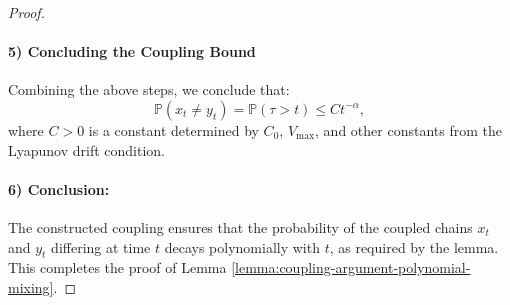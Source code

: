 \begin{proof}
\paragraph{5) Concluding the Coupling Bound}
Combining the above steps, we conclude that:
\[
\mathbb{P}(x_t \neq y_t) = \mathbb{P}(\tau > t) \leq C t^{-\alpha},
\]
where \( C > 0 \) is a constant determined by \( C_0 \), \( V_{\max} \), and other constants from the Lyapunov drift condition.
\paragraph{6) Conclusion:}
The constructed coupling ensures that the probability of the coupled chains \( x_t \) and \( y_t \) differing at time \( t \) decays polynomially with \( t \), as required by the lemma. This completes the proof of Lemma \ref{lemma:coupling-argument-polynomial-mixing}.
\end{proof}